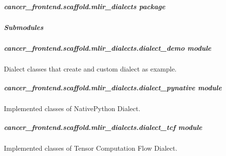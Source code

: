 \documentclass[letterpaper,10pt,english]{sphinxmanual}
\begin{document}
\subparagraph{cancer\_frontend.scaffold.mlir\_dialects package}
\label{\detokenize{cancer_frontend.scaffold.mlir_dialects:cancer-frontend-scaffold-mlir-dialects-package}}\label{\detokenize{cancer_frontend.scaffold.mlir_dialects::doc}}

\subparagraph{Submodules}
\label{\detokenize{cancer_frontend.scaffold.mlir_dialects:submodules}}

\subparagraph{cancer\_frontend.scaffold.mlir\_dialects.dialect\_demo module}
\label{\detokenize{cancer_frontend.scaffold.mlir_dialects:module-cancer_frontend.scaffold.mlir_dialects.dialect_demo}}\label{\detokenize{cancer_frontend.scaffold.mlir_dialects:cancer-frontend-scaffold-mlir-dialects-dialect-demo-module}}
\sphinxAtStartPar
Dialect classes that create and custom dialect as example.


\subparagraph{cancer\_frontend.scaffold.mlir\_dialects.dialect\_pynative module}
\label{\detokenize{cancer_frontend.scaffold.mlir_dialects:module-cancer_frontend.scaffold.mlir_dialects.dialect_pynative}}\label{\detokenize{cancer_frontend.scaffold.mlir_dialects:cancer-frontend-scaffold-mlir-dialects-dialect-pynative-module}}
\sphinxAtStartPar
Implemented classes of NativePython Dialect.


\subparagraph{cancer\_frontend.scaffold.mlir\_dialects.dialect\_tcf module}
\label{\detokenize{cancer_frontend.scaffold.mlir_dialects:module-cancer_frontend.scaffold.mlir_dialects.dialect_tcf}}\label{\detokenize{cancer_frontend.scaffold.mlir_dialects:cancer-frontend-scaffold-mlir-dialects-dialect-tcf-module}}
\sphinxAtStartPar
Implemented classes of Tensor Computation Flow Dialect.
\end{document}
